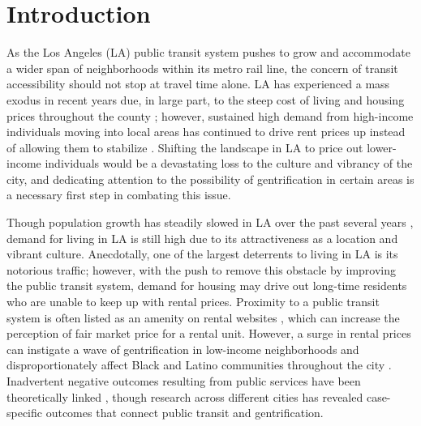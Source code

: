 \documentclass[11pt]{article}
\begin{document}
\vspace{1em}

\section{Introduction}

As the Los Angeles (LA) public transit system pushes to grow and accommodate a wider span of neighborhoods within its metro rail line, the concern of transit accessibility should not stop at travel time alone. LA has experienced a mass exodus in recent years due, in large part, to the steep cost of living and housing prices throughout the county \citep{flemming2026thousands}; however, sustained high demand from high-income individuals moving into local areas has continued to drive rent prices up instead of allowing them to stabilize \citep{mcmillen2020fair, walters2024housing}. Shifting the landscape in LA to price out lower-income individuals would be a devastating loss to the culture and vibrancy of the city, and dedicating attention to the possibility of gentrification in certain areas is a necessary first step in combating this issue.

Though population growth has steadily slowed in LA over the past several years \citep{ferrara2026population, worldpopulationreview2026la}, demand for living in LA is still high due to its attractiveness as a location and vibrant culture. Anecdotally, one of the largest deterrents to living in LA is its notorious traffic; however, with the push to remove this obstacle by improving the public transit system, demand for housing may drive out long-time residents who are unable to keep up with rental prices. Proximity to a public transit system is often listed as an amenity on rental websites \citep{apta2019locations}, which can increase the perception of fair market price for a rental unit. However, a surge in rental prices can instigate a wave of gentrification in low-income neighborhoods and disproportionately affect Black and Latino communities throughout the city \citep{rucksahidiana2022theorizing}. Inadvertent negative outcomes resulting from public services have been theoretically linked \citep{debrezion2007impact}, though research across different cities has revealed case-specific outcomes that connect public transit and gentrification.
\end{document}
